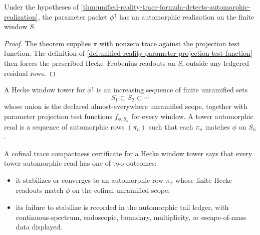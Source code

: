 \begin{corollary}
\label{cor:unified-reality-finite-window-automorphic-realization}
Under the hypotheses of
\autoref{thm:unified-reality-trace-formula-detects-automorphic-realization},
the parameter packet $\phi^{\uparrow}$ has an automorphic realization on
the finite window $S$.
\end{corollary}
\begin{proof}
The theorem supplies $\pi$ with nonzero trace against the projection
test function. The definition of
\autoref{def:unified-reality-parameter-projection-test-function} then
forces the prescribed Hecke--Frobenius readouts on $S$, outside any
ledgered residual rows.
\end{proof}

\begin{definition}
\label{def:unified-reality-hecke-window-tower}
A Hecke window tower for $\phi^{\uparrow}$ is an increasing sequence of
finite unramified sets
$$
S_1\subset S_2\subset\cdots
$$
whose union is the declared almost-everywhere unramified scope, together
with parameter projection test functions $f_{\phi,S_n}$ for every
window. A tower automorphic read is a sequence of automorphic rows
$(\pi_n)$ such that each $\pi_n$ matches $\phi$ on $S_n$.
\end{definition}

\begin{definition}
\label{def:unified-reality-cofinal-trace-compactness-certificate}
A cofinal trace compactness certificate for a Hecke window tower says
that every tower automorphic read has one of two outcomes:
\begin{itemize}
\item it stabilizes or converges to an automorphic row $\pi_{\phi}$
whose finite Hecke readouts match $\phi$ on the cofinal unramified
scope;
\item its failure to stabilize is recorded in the automorphic tail
ledger, with continuous-spectrum, endoscopic, boundary, multiplicity,
or escape-of-mass data displayed.
\end{itemize}
\end{definition}

